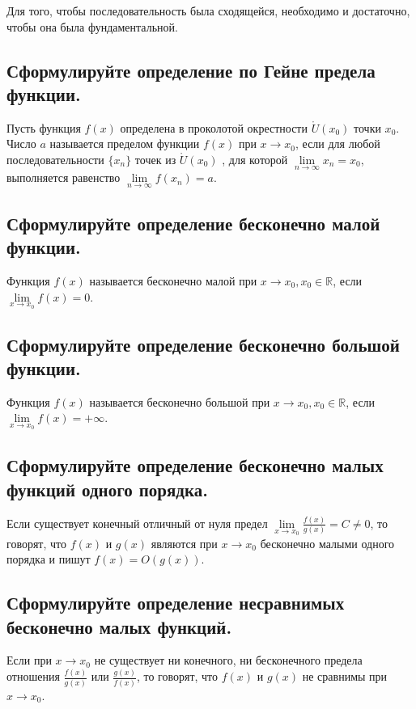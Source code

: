 \documentclass[a4paper, 10pt]{article}
\begin{document}
    Для того, чтобы последовательность была сходящейся, необходимо и достаточно, чтобы она была фундаментальной.

    \subsection{Сформулируйте определение по Гейне предела функции.}

    Пусть функция $f(x)$ определена в проколотой окрестности $\mathring U(x_0)$ точки $x_0$. 
    Число $a$ называется пределом функции $f(x)$ при $x \to x_0$, если для любой последовательности 
    $\{x_n\}$ точек из $\mathring U(x_0)$ , для которой $\lim\limits_{n \to \infty} x_n = x_0$,
    выполняется равенство $\lim\limits_{n \to \infty} f(x_n) = a$.

    \subsection{Сформулируйте определение бесконечно малой функции.}

    Функция $f(x)$ называется бесконечно малой при $x \to x_0, x_0 \in \mathbb{R}$, если 
    $\lim\limits_{x \to x_0} f(x) = 0$.

    \subsection{Сформулируйте определение бесконечно большой функции.}
    
    Функция $f(x)$ называется бесконечно большой при $x \to x_0, x_0 \in \mathbb{R}$, 
    если $\lim\limits_{x \to x_0} f(x) = +\infty$.

    \subsection{Сформулируйте определение бесконечно малых функций одного порядка.}

    Если существует конечный отличный от нуля предел $\lim\limits_{x \to x_0}\frac{f(x)}{g(x)} = C \ne 0$,
    то говорят, что $f(x)$ и $g(x)$ являются при $x \to x_0$ бесконечно малыми одного порядка и пишут $f(x) = O(g(x))$.

    \subsection{Сформулируйте определение несравнимых бесконечно малых функций.}

    Если при $x \to x_0$ не существует ни конечного, ни бесконечного предела 
    отношения $\frac{f(x)}{g(x)}$ или $\frac{g(x)}{f(x)}$, то говорят, что $f(x)$ и $g(x)$ не сравнимы при $x \to x_0$.
\end{document}
